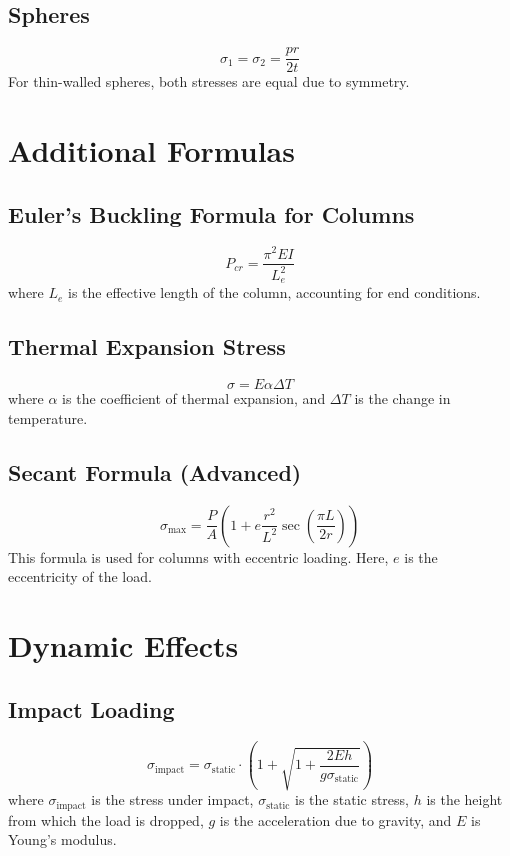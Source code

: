\documentclass[12pt]{article}
\begin{document}
\subsection{Spheres}
\begin{equation}
\sigma_1 = \sigma_2 = \frac{p r}{2t}
\end{equation}
For thin-walled spheres, both stresses are equal due to symmetry.

\section{Additional Formulas}
\subsection{Euler's Buckling Formula for Columns}
\begin{equation}
P_{cr} = \frac{\pi^2 E I}{L_e^2}
\end{equation}
where $L_e$ is the effective length of the column, accounting for end conditions.

\subsection{Thermal Expansion Stress}
\begin{equation}
\sigma = E \alpha \Delta T
\end{equation}
where $\alpha$ is the coefficient of thermal expansion, and $\Delta T$ is the change in temperature.

\subsection{Secant Formula (Advanced)}
\begin{equation}
\sigma_{\text{max}} = \frac{P}{A} \left( 1 + e \frac{r^2}{L^2} \sec \left( \frac{\pi L}{2r} \right) \right)
\end{equation}
This formula is used for columns with eccentric loading. Here, $e$ is the eccentricity of the load.

\section{Dynamic Effects}

\subsection{Impact Loading}
\begin{equation}
\sigma_{\text{impact}} = \sigma_{\text{static}} \cdot \left(1 + \sqrt{1 + \frac{2E h}{g \sigma_{\text{static}}}}\right)
\end{equation}
where $\sigma_{\text{impact}}$ is the stress under impact, $\sigma_{\text{static}}$ is the static stress, $h$ is the height from which the load is dropped, $g$ is the acceleration due to gravity, and $E$ is Young's modulus.
\end{document}

